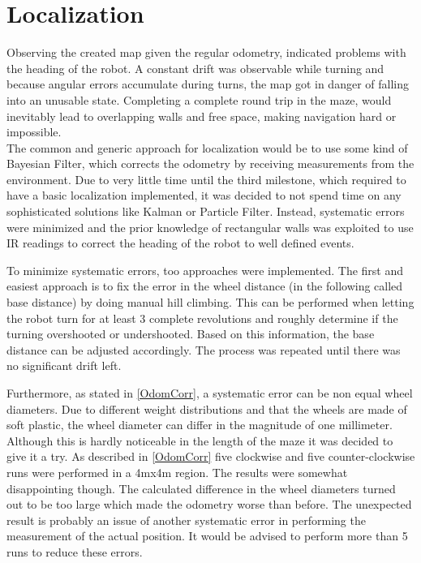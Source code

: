 \section{Localization}

Observing the created map given the regular odometry, indicated problems with the heading of the robot.
A constant drift was observable while turning and because angular errors accumulate during turns,
the map got in danger of falling into an unusable state.
Completing a complete round trip in the maze, would inevitably lead to overlapping walls and free space,
making navigation hard or impossible.\\

The common and generic approach for localization would be to use some kind of Bayesian Filter,
which corrects the odometry by receiving measurements from the environment.
Due to very little time until the third milestone, which required to have a basic localization implemented,
it was decided to not spend time on any sophisticated solutions like Kalman or Particle Filter.
Instead, systematic errors were minimized and the prior knowledge of rectangular walls was exploited to use IR readings to correct
the heading of the robot to well defined events.

To minimize systematic errors, too approaches were implemented.
The first and easiest approach is to fix the error in the wheel distance (in the following called base distance) by doing manual hill climbing.
This can be performed when letting the robot turn for at least 3 complete revolutions and roughly determine if the turning overshooted or undershooted.
Based on this information, the base distance can be adjusted accordingly.
The process was repeated until there was no significant drift left.

Furthermore, as stated in \ref{OdomCorr}, a systematic error can be non equal wheel diameters.
Due to different weight distributions and that the wheels are made of soft plastic, 
the wheel diameter can differ in the magnitude of one millimeter. 
Although this is hardly noticeable in the length of the maze it was decided to give it a try.
As described in \ref{OdomCorr} five clockwise and five counter-clockwise runs were performed in a 4mx4m region.
The results were somewhat disappointing though. 
The calculated difference in the wheel diameters turned out to be too large which made the odometry worse than before.
The unexpected result is probably an issue of another systematic error in performing the measurement of the actual position.
It would be advised to perform more than 5 runs to reduce these errors.

